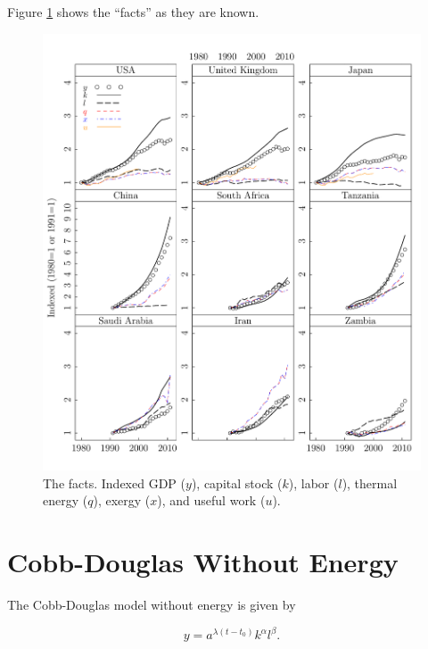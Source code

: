 \documentclass[preprint,authoryear,12pt]{elsarticle}\usepackage{graphicx, color}
\makeatletter
\def\maxwidth{ %
  \ifdim\Gin@nat@width>\linewidth
    \linewidth
  \else
    \Gin@nat@width
  \fi
}
\newenvironment{knitrout}{}{} %
\makeatother
\begin{document}
Figure \ref{fig:Factors_Lattice_Graph} shows the ``facts'' as they are known.

\begin{knitrout}
\color{fgcolor}\begin{figure}[]

\includegraphics[width=\maxwidth]{figure/Factors_Lattice_Graph} \caption[The facts]{The facts. Indexed GDP ($y$), capital stock ($k$), labor ($l$), thermal energy ($q$), exergy ($x$), and useful work ($u$).\label{fig:Factors_Lattice_Graph}}
\end{figure}


\end{knitrout}


\section{Cobb-Douglas Without Energy}




The Cobb-Douglas model without energy is given by

\begin{equation} \label{eq:CD_No_Energy}
  y = a^{\lambda (t-t_0)}k^{\alpha}l^{\beta}.
\end{equation}
\end{document}

